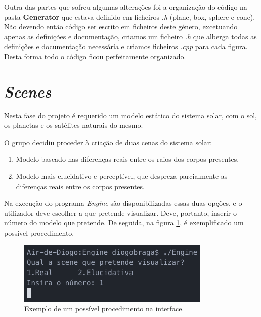 \documentclass[a4paper]{article}
\begin{document}
Outra das partes que sofreu algumas alterações foi a organização do código na pasta \textbf{Generator} que estava definido em ficheiros \emph{.h} (plane, box, sphere e cone). Não devendo então código ser escrito em ficheiros deste género, excetuando apenas as definições e documentação, criamos um ficheiro \emph{.h} que alberga todas as definições e documentação necessária e criamos ficheiros \emph{.cpp} para cada figura. Desta forma todo o código ficou perfeitamente organizado.


\newpage

\section{\textit{Scenes}}

Nesta fase do projeto é requerido um modelo estático do sistema solar, com o sol, os planetas e os satélites naturais do mesmo.

  \vspace{0.5cm}

O grupo decidiu proceder à criação de duas cenas do sistema solar:

\begin{enumerate}
\item Modelo baseado nas diferenças reais entre os raios dos corpos presentes.
\item Modelo mais elucidativo e perceptível, que despreza parcialmente as diferenças reais entre os corpos presentes.
\end{enumerate}

  \vspace{0.5cm}

Na execução do programa \textit{Engine} são disponibilizadas essas duas opções, e o utilizador deve escolher a que pretende visualizar. Deve, portanto, inserir o número do modelo que pretende. De seguida, na figura \ref{img:interface}, é exemplificado um possível procedimento.

\begin{figure}[H]
\centering
\includegraphics[scale=0.5]{interface.png}
\caption{Exemplo de um possível procedimento na interface.}
\label{img:interface}
\end{figure}
\end{document}
